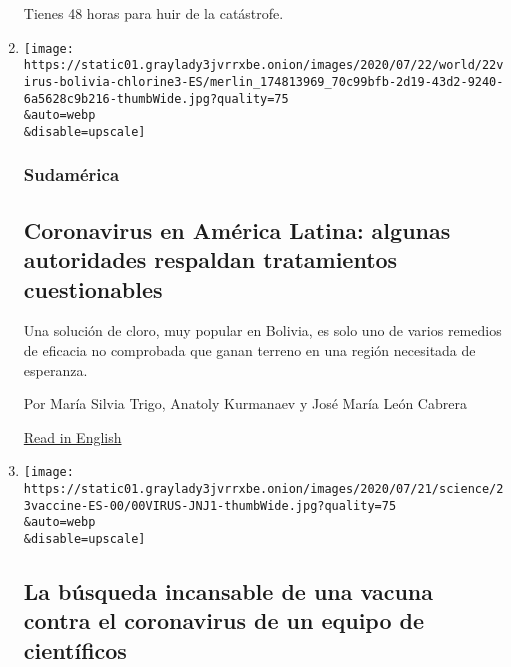 \begin{enumerate}
  Tienes 48 horas para huir de la catástrofe.
\item
  \href{/es/2020/07/23/espanol/america-latina/bolivia-cloro-coronavirus-ivermectina.html}{}

  \texttt{[image: https://static01.graylady3jvrrxbe.onion/images/2020/07/22/world/22virus-bolivia-chlorine3-ES/merlin\_174813969\_70c99bfb-2d19-43d2-9240-6a5628c9b216-thumbWide.jpg?quality=75\\\&auto=webp\\\&disable=upscale]}

  \hypertarget{sudamuxe9rica}{%
  \subsubsection{Sudamérica}\label{sudamuxe9rica}}

  \hypertarget{coronavirus-en-amuxe9rica-latina-algunas-autoridades-respaldan-tratamientos-cuestionables}{%
  \subsection{Coronavirus en América Latina: algunas autoridades
  respaldan tratamientos
  cuestionables}\label{coronavirus-en-amuxe9rica-latina-algunas-autoridades-respaldan-tratamientos-cuestionables}}

  Una solución de cloro, muy popular en Bolivia, es solo uno de varios
  remedios de eficacia no comprobada que ganan terreno en una región
  necesitada de esperanza.

  Por María Silvia Trigo, Anatoly Kurmanaev y José María León Cabrera

  \href{https://www.nytimes3xbfgragh.onion/2020/07/23/world/americas/chlorine-coronavirus-bolivia-latin-america.html}{Read
  in English}
\item
  \href{/es/2020/07/23/espanol/ciencia-y-tecnologia/vacuna-coronavirus.html}{}

  \texttt{[image: https://static01.graylady3jvrrxbe.onion/images/2020/07/21/science/23vaccine-ES-00/00VIRUS-JNJ1-thumbWide.jpg?quality=75\\\&auto=webp\\\&disable=upscale]}

  \hypertarget{la-buxfasqueda-incansable-de-una-vacuna-contra-el-coronavirus-de-un-equipo-de-cientuxedficos}{%
  \subsection{La búsqueda incansable de una vacuna contra el coronavirus
  de un equipo de
  científicos}\label{la-buxfasqueda-incansable-de-una-vacuna-contra-el-coronavirus-de-un-equipo-de-cientuxedficos}}


\end{enumerate}
